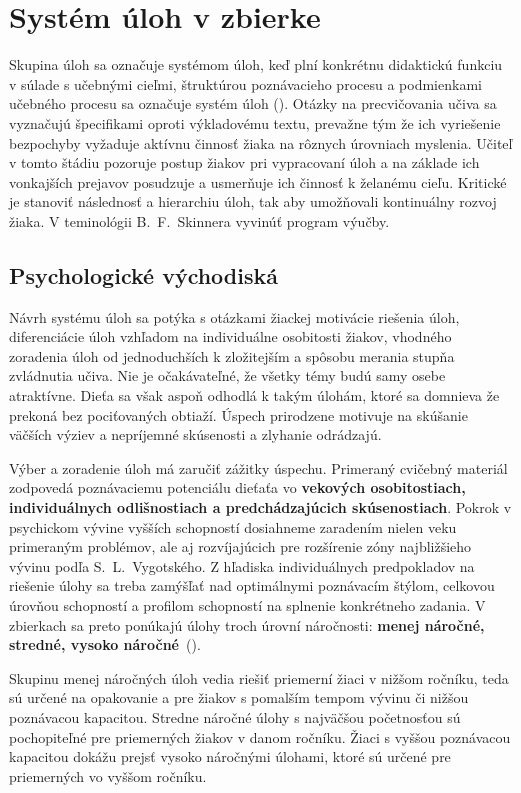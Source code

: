 \section{Systém úloh v zbierke}
Skupina úloh sa označuje systémom úloh, keď plní konkrétnu didaktickú funkciu v súlade s učebnými cieľmi, štruktúrou poznávacieho procesu a podmienkami učebného procesu sa označuje systém úloh (\cite{mindakova_tvorba_2008}). Otázky na precvičovania učiva sa vyznačujú špecifikami oproti výkladovému textu, prevažne tým že ich vyriešenie bezpochyby vyžaduje aktívnu činnosť žiaka na rôznych úrovniach myslenia. Učiteľ v tomto štádiu pozoruje postup žiakov pri vypracovaní úloh a na základe ich vonkajších prejavov posudzuje a usmerňuje ich činnosť k želanému cieľu. Kritické je stanoviť následnosť a hierarchiu úloh, tak aby umožňovali kontinuálny rozvoj žiaka. V teminológii B.~F.~Skinnera vyvinúť program výučby.   

\subsection{Psychologické východiská}
Návrh systému úloh sa potýka s otázkami žiackej motivácie riešenia úloh, diferenciácie úloh vzhľadom na individuálne osobitosti žiakov, vhodného zoradenia úloh od jednoduchších k zložitejším a spôsobu merania stupňa zvládnutia učiva. Nie je očakávateľné, že všetky témy budú samy osebe atraktívne. Dieťa sa však aspoň odhodlá k takým úlohám, ktoré sa domnieva že prekoná bez pociťovaných obtiaží. Úspech prirodzene motivuje na skúšanie väčších výziev a nepríjemné skúsenosti a zlyhanie odrádzajú. 

Výber a zoradenie úloh má zaručiť zážitky úspechu. Primeraný cvičebný materiál zodpovedá poznávaciemu potenciálu dieťaťa vo \textbf{vekových osobitostiach, individuálnych odlišnostiach a predchádzajúcich skúsenostiach}. Pokrok v psychickom vývine vyšších schopností dosiahneme zaradením nielen veku primeraným problémov, ale aj rozvíjajúcich pre rozšírenie zóny najbližšieho vývinu podľa S.~L.~Vygotského. Z hľadiska individuálnych predpokladov na riešenie úlohy sa treba zamýšľať nad optimálnymi poznávacím štýlom, celkovou úrovňou schopností a profilom schopností na splnenie konkrétneho zadania. V zbierkach sa preto ponúkajú úlohy troch úrovní náročnosti: \textbf{menej náročné, stredné, vysoko náročné}~(\cite{pavlovkin_ziak_1989}).
 
Skupinu menej náročných úloh vedia riešiť priemerní žiaci v nižšom ročníku, teda sú určené na opakovanie a pre žiakov s pomalším tempom vývinu či nižšou poznávacou kapacitou. Stredne náročné úlohy s najväčšou početnosťou sú pochopiteľné pre priemerných žiakov v danom ročníku. Žiaci s vyššou poznávacou kapacitou dokážu prejsť vysoko náročnými úlohami, ktoré sú určené pre priemerných vo vyššom ročníku.
 
